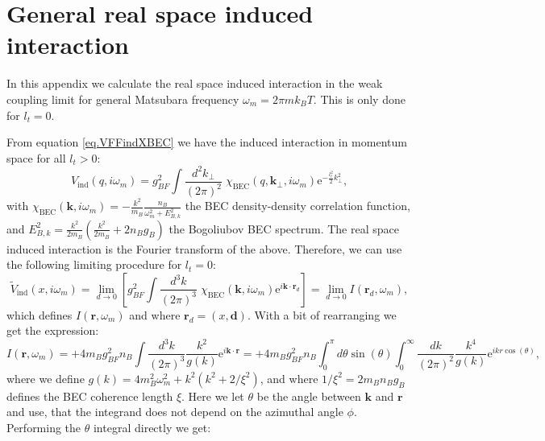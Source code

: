 
\chapter{General real space induced interaction} %

\label{Appendix.inducedinteraction.realspace} %
\chead{}
In this appendix we calculate the real space induced interaction in the weak coupling limit for general Matsubara frequency $\omega_m = 2\pi m k_B T$. This is only done for $l_t = 0$. 

From equation \eqref{eq.VFFindXBEC} we have the induced interaction in momentum space for all $l_t > 0$:
\begin{equation}
V_{\text{ind}}(q, i\omega_m) = g_{BF}^2\int\frac{d^2k_\perp}{(2\pi)^2}\; \chi_\text{BEC}(q, \mathbf{k}_\perp, i\omega_m)\text{e}^{-\frac{l_t^2}{2}k_\perp^2},\nonumber
\end{equation}
with $\chi_\text{BEC}(\mathbf{k}, i\omega_m) = -\frac{k^2}{m_B}\frac{n_B}{\omega^2_m + E_{B,k}^2}$ the BEC density-density correlation function, and $E^2_{B,k} = \frac{k^2}{2m_B}\left(\frac{k^2}{2m_B} + 2n_Bg_B\right)$ the Bogoliubov BEC spectrum. The real space induced interaction is the Fourier transform of the above. Therefore, we can use the following limiting procedure for $l_t = 0$:
\begin{equation}
\tilde{V}_{\text{ind}}(x, i\omega_m) = \lim_{d \to 0}\left[g_{BF}^2\int\frac{d^3k}{(2\pi)^3}\; \chi_\text{BEC}(\mathbf{k}, i\omega_m)\text{e}^{i\mathbf{k}\cdot \mathbf{r}_d}\right] = \lim_{d \to 0} I(\mathbf{r}_d, \omega_m), 
\label{eq.limitVindxomegam}
\end{equation}
which defines $I(\mathbf{r}, \omega_m)$ and where $\mathbf{r}_d = (x, \mathbf{d})$. With a bit of rearranging we get the expression:
\begin{equation}
I(\mathbf{r}, \omega_m) = +4m_Bg^2_{BF}n_B\int \frac{d^3k}{(2\pi)^3} \frac{k^2}{g(k)}\text{e}^{i\mathbf{k}\cdot\mathbf{r}} = +4m_Bg^2_{BF}n_B\int_0^\pi d\theta \sin(\theta)\int_0^{\infty} \frac{dk}{(2\pi)^2} \frac{k^4}{g(k)}\text{e}^{ikr\cos(\theta)}, \nonumber
\end{equation}
where we define $g(k) = 4m_B^2\omega^2_m + k^2(k^2 + 2/\xi^2)$, and where $1/\xi^2 = 2m_Bn_Bg_B$ defines the BEC coherence length $\xi$. Here we let $\theta$ be the angle between $\mathbf{k}$ and $\mathbf{r}$ and use, that the integrand does not depend on the azimuthal angle $\phi$. Performing the $\theta$ integral directly we get:

